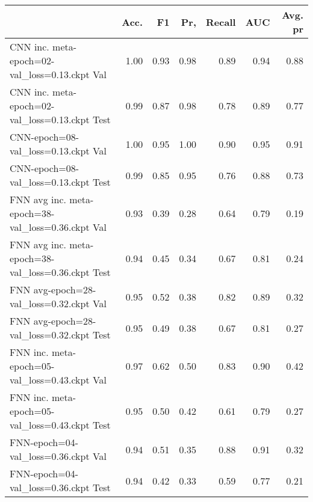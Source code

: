 \begin{tabular}{lrrrrrr}
\toprule
{} &  Acc. &    F1 &   Pr, &  Recall &   AUC &  Avg. pr \\
\midrule
CNN inc. meta-epoch=02-val\_loss=0.13.ckpt Val      &  1.00 &  0.93 &  0.98 &    0.89 &  0.94 &     0.88 \\
CNN inc. meta-epoch=02-val\_loss=0.13.ckpt Test     &  0.99 &  0.87 &  0.98 &    0.78 &  0.89 &     0.77 \\
CNN-epoch=08-val\_loss=0.13.ckpt Val                &  1.00 &  0.95 &  1.00 &    0.90 &  0.95 &     0.91 \\
CNN-epoch=08-val\_loss=0.13.ckpt Test               &  0.99 &  0.85 &  0.95 &    0.76 &  0.88 &     0.73 \\
FNN avg inc. meta-epoch=38-val\_loss=0.36.ckpt Val  &  0.93 &  0.39 &  0.28 &    0.64 &  0.79 &     0.19 \\
FNN avg inc. meta-epoch=38-val\_loss=0.36.ckpt Test &  0.94 &  0.45 &  0.34 &    0.67 &  0.81 &     0.24 \\
FNN avg-epoch=28-val\_loss=0.32.ckpt Val            &  0.95 &  0.52 &  0.38 &    0.82 &  0.89 &     0.32 \\
FNN avg-epoch=28-val\_loss=0.32.ckpt Test           &  0.95 &  0.49 &  0.38 &    0.67 &  0.81 &     0.27 \\
FNN inc. meta-epoch=05-val\_loss=0.43.ckpt Val      &  0.97 &  0.62 &  0.50 &    0.83 &  0.90 &     0.42 \\
FNN inc. meta-epoch=05-val\_loss=0.43.ckpt Test     &  0.95 &  0.50 &  0.42 &    0.61 &  0.79 &     0.27 \\
FNN-epoch=04-val\_loss=0.36.ckpt Val                &  0.94 &  0.51 &  0.35 &    0.88 &  0.91 &     0.32 \\
FNN-epoch=04-val\_loss=0.36.ckpt Test               &  0.94 &  0.42 &  0.33 &    0.59 &  0.77 &     0.21 \\
\bottomrule
\end{tabular}
